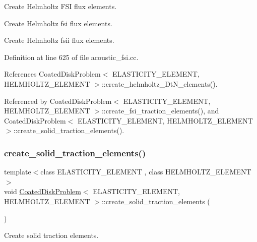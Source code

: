 Create Helmholtz F\+SI flux elements. 

Create Helmholtz fsi flux elements.

Create Helmholtz fsii flux elements. 

Definition at line 625 of file acoustic\+\_\+fsi.\+cc.



References Coated\+Disk\+Problem$<$ E\+L\+A\+S\+T\+I\+C\+I\+T\+Y\+\_\+\+E\+L\+E\+M\+E\+N\+T, H\+E\+L\+M\+H\+O\+L\+T\+Z\+\_\+\+E\+L\+E\+M\+E\+N\+T $>$\+::create\+\_\+helmholtz\+\_\+\+Dt\+N\+\_\+elements().



Referenced by Coated\+Disk\+Problem$<$ E\+L\+A\+S\+T\+I\+C\+I\+T\+Y\+\_\+\+E\+L\+E\+M\+E\+N\+T, H\+E\+L\+M\+H\+O\+L\+T\+Z\+\_\+\+E\+L\+E\+M\+E\+N\+T $>$\+::create\+\_\+fsi\+\_\+traction\+\_\+elements(), and Coated\+Disk\+Problem$<$ E\+L\+A\+S\+T\+I\+C\+I\+T\+Y\+\_\+\+E\+L\+E\+M\+E\+N\+T, H\+E\+L\+M\+H\+O\+L\+T\+Z\+\_\+\+E\+L\+E\+M\+E\+N\+T $>$\+::create\+\_\+solid\+\_\+traction\+\_\+elements().

\mbox{\label{classCoatedDiskProblem_a31c3707de78a720e3936e3b34e70b1ba}} 
\subsubsection{\texorpdfstring{create\+\_\+solid\+\_\+traction\+\_\+elements()}{create\_solid\_traction\_elements()}}
{\footnotesize\ttfamily template$<$class E\+L\+A\+S\+T\+I\+C\+I\+T\+Y\+\_\+\+E\+L\+E\+M\+E\+NT , class H\+E\+L\+M\+H\+O\+L\+T\+Z\+\_\+\+E\+L\+E\+M\+E\+NT $>$ \\
void \hyperlink{classCoatedDiskProblem}{Coated\+Disk\+Problem}$<$ E\+L\+A\+S\+T\+I\+C\+I\+T\+Y\+\_\+\+E\+L\+E\+M\+E\+NT, H\+E\+L\+M\+H\+O\+L\+T\+Z\+\_\+\+E\+L\+E\+M\+E\+NT $>$\+::create\+\_\+solid\+\_\+traction\+\_\+elements (\begin{DoxyParamCaption}{ }\end{DoxyParamCaption})\hspace{0.3cm}{\ttfamily [private]}}



Create solid traction elements. 



